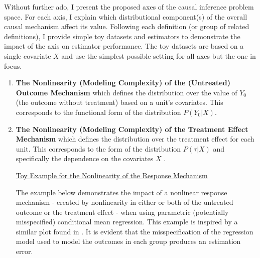 \documentclass[../main.tex]{subfiles}
\begin{document}

\vspace{\baselineskip}
Without further ado, I present the proposed axes of the causal inference problem space. For each axis, I explain which distributional component(s) of the overall causal mechanism affect its value. Following each definition (or group of related definitions), I provide simple toy datasets and estimators to demonstrate the impact of the axis on estimator performance. The toy datasets are based on a single covariate  \( X \) and use the simplest possible setting for all axes but the one in focus.\par


\vspace{\baselineskip}
\begin{enumerate}
    \item \textbf{The Nonlinearity (Modeling Complexity) of the (Untreated) Outcome Mechanism} which defines the distribution over the value of  \( Y_{0} \)  (the outcome without treatment) based on a unit’s covariates. This corresponds to the functional form of the distribution  \( P \left( Y_{0}  \vert  X \right)  \). \par


\vspace{\baselineskip}
    \item \textbf{The Nonlinearity (Modeling Complexity) of the Treatment Effect Mechanism} which defines the distribution over the treatment effect for each unit. This corresponds to the form of the distribution  \( P \left(  \tau  \vert  X \right)  \)  and specifically the dependence on the covariates  \( X \) . \par

\uline{Toy Example for the Nonlinearity of the Response Mechanism}\par

\vspace{\baselineskip}

The example below demonstrates the impact of a nonlinear response mechanism - created by nonlinearity in either or both of the untreated outcome or the treatment effect - when using parametric (potentially misspecified) conditional mean regression. This example is inspired by a similar plot found in \textcite{Hill2011BayesianInference}. It is evident that the misspecification of the regression model used to model the outcomes in each group produces an estimation error.

\vspace{\baselineskip}


\end{enumerate}
\end{document}
